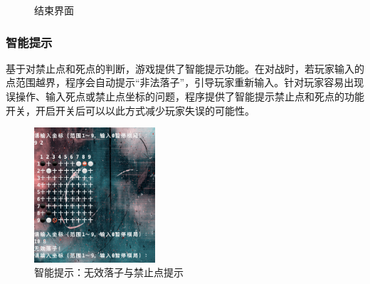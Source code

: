 \documentclass[twocolumn]{article}
\begin{document}
\begin{figure}[H]
\centering
{}
\caption{结束界面}
\label{Fig8}
\end{figure}
\subsubsection{智能提示}
基于对禁止点和死点的判断，游戏提供了智能提示功能。在对战时，若玩家输入的点范围越界，程序会自动提示“非法落子”，引导玩家重新输入。针对玩家容易出现误操作、输入死点或禁止点坐标的问题，程序提供了智能提示禁止点和死点的功能开关，开启开关后可以以此方式减少玩家失误的可能性。
\begin{figure}[H]
\centering
\includegraphics[width=0.4\textwidth]{fig14}
\caption{智能提示：无效落子与禁止点提示}
\label{Fig智能提示}
\end{figure}
\end{document}
